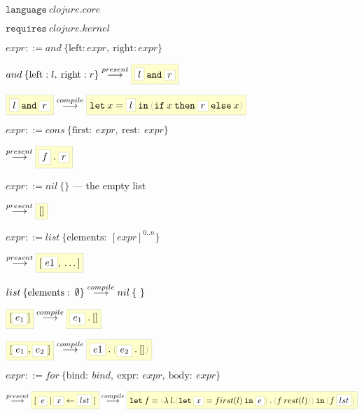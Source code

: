 \documentclass[110pt]{amsart}
\newcommand{\keyword}[1]{\ensuremath{\mathtt{#1}}}
\newcommand{\embed}[1]{\ensuremath{\fcolorbox{literal}{literalbg}{\ensuremath{#1}}}}
\newcommand{\unbed}[1]{\ensuremath{\fcolorbox{literal}{white}{\ensuremath{#1}}}}
\newcommand{\quoted}[1]{\ensuremath{\fcolorbox{literal}{literalbg}{\ensuremath{#1}}}}
\newcommand{\unquoted}[1]{\ensuremath{\fcolorbox{literal}{white}{\ensuremath{#1}}}}
\newcommand{\node}[2]{\ensuremath{#1 \: \{ #2 \}}}
\newcommand{\attr}[2]{\ensuremath{\mathrm{#1} : \: #2}}
\newcommand{\reducep}{\ensuremath{\overset{present}{\longrightarrow}}}
\newcommand{\reducec}{\ensuremath{\overset{compile}{\longrightarrow}}}
\newcommand{\gray}[1]{ {\color[gray]{.7}#1}}
\newcommand{\gparens}[1]{ \gray{(} #1 \gray{)} }
\begin{document}
\vspace{12pt}

$\keyword{language} \: clojure.core$

$\keyword{requires} \: clojure.kernel$

\vspace{12pt}

$expr ::= and \: \{ \mathrm{left}: expr, \: \mathrm{right}: expr \}$

$and \: \{ \mathrm{left}: l, \: \mathrm{right}: r \} 
\overset{present}{\longrightarrow} 
\embed{\unbed{l} \: \keyword{and} \: \unbed{r}}$

$\embed{\unbed{l} \: \keyword{and} \: \unbed{r}}
\overset{compile}{\longrightarrow}
\embed{\keyword{let} \: x = \unbed{l} \: \keyword{in} \:
	\gparens{ \keyword{if} \: x \: \keyword{then} \: \unbed{r} \: \keyword{else} \: x } }$


\vspace{12pt}
$expr ::= \node{cons}{\attr{first}{expr}, \: \attr{rest}{expr}}$

$\reducep \embed{\unbed{f} \: . \: \unbed{r}}$

\vspace{12pt}
$expr ::= \node{nil}{}$  --- the empty list

$\reducep \embed{[]}$


\vspace{12pt}

$expr ::= \node{list}{\attr{elements}{[ expr ]^{0..n}}}$

$\reducep \quoted{ [ \unquoted{e1}, \: \dots ] }$

$\node{list}{\attr{elements}{\emptyset}} \reducec \node{nil}$

$\quoted{ [ \unquoted{e_1} ] } 
\reducec 
\quoted{ \unquoted{e_1} \: . \: [] }$

$\quoted{ [ \unquoted{e_1}, \unquoted{e_2} ] } 
\reducec 
\quoted{ \unquoted{e1} \: . \: \gray{(} \unquoted{e_2} \: . \: [] \gray{)} }$


\vspace{12pt}

$expr ::= \node{for}{\attr{bind}{bind}, \: \attr{expr}{expr}, \: \attr{body}{expr}}$

$
\reducep 
\quoted{ [ \: \unquoted{e} \: | \: \unquoted{x} \leftarrow \unquoted{lst} \: ]}
\reducec 
\quoted{ \keyword{let} \: f = 
	\gparens{ \lambda \: l.
		\gparens{ \keyword{let} \: \unquoted{x} = 
					first(l) \: \keyword{in} \: \unquoted{e} } 
		\: . \:
		\gparens{ f \: rest(l) } } \:
	\keyword{in} \:
	\gparens{ f \: \unquoted{lst}} }
$
\end{document}
